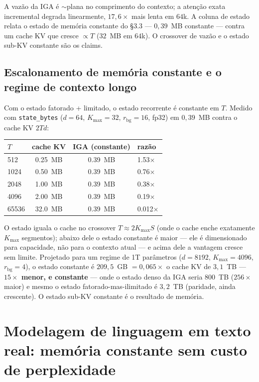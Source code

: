 \documentclass[11pt]{article}
\begin{document}
A vaz\~ao da IGA \'e $\sim$plana no comprimento do contexto; a aten\c{c}\~ao exata
incremental degrada linearmente, $17{,}6\times$ mais lenta em $64$k. A coluna de
estado relata o estado de mem\'oria constante do \S3.3 --- $0{,}39$~MB constante
--- contra um cache KV que cresce $\propto T$ ($32$~MB em $64$k). O crossover de
vaz\~ao e o estado sub-KV constante s\~ao os claims.

\subsection{Escalonamento de mem\'oria constante e o regime de contexto longo}

Com o estado fatorado + limitado, o estado recorrente \'e constante em $T$.
Medido com \texttt{state\_bytes} ($d=64$, $K_{\max}=32$, $r_{\mathrm{bg}}=16$,
fp32) em $0{,}39$~MB contra o cache KV $2Td$:

\begin{table}[h]\centering
\begin{tabular}{lccl}
\toprule
$T$ & cache KV & IGA (constante) & raz\~ao \\
\midrule
512   & 0.25~MB  & 0.39~MB & 1.53$\times$ \\
1024  & 0.50~MB  & 0.39~MB & 0.76$\times$ \\
2048  & 1.00~MB  & 0.39~MB & 0.38$\times$ \\
4096  & 2.00~MB  & 0.39~MB & 0.19$\times$ \\
65536 & 32.0~MB  & 0.39~MB & 0.012$\times$ \\
\bottomrule
\end{tabular}
\end{table}

O estado iguala o cache no crossover $T\approx 2K_{\max}S$ (onde o cache enche
exatamente $K_{\max}$ segmentos); abaixo dele o estado constante \'e maior ---
ele \'e dimensionado para capacidade, n\~ao para o contexto atual --- e acima dele
a vantagem cresce sem limite. Projetado para um regime de 1T par\^ametros
($d=8192$, $K_{\max}=4096$, $r_{\mathrm{bg}}=4$), o estado constante \'e
$209{,}5$~GB $=0{,}065\times$ o cache KV de $3{,}1$~TB ---
\textbf{$15\times$ menor, e constante} --- onde o estado denso da IGA seria
$800$~TB ($256\times$ maior) e mesmo o estado fatorado-mas-ilimitado \'e
$3{,}2$~TB (paridade, ainda crescente). O estado sub-KV constante \'e o resultado
de mem\'oria.

\section{Modelagem de linguagem em texto real: mem\'oria constante sem custo de
perplexidade}
\end{document}

